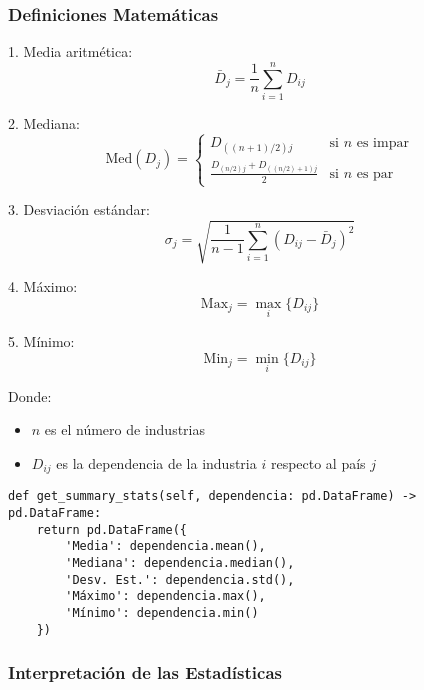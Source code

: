 \documentclass[11pt,a4paper]{article}
\begin{document}
\subsubsection{Definiciones Matemáticas}

1. Media aritmética:
\begin{equation}
\bar{D}_j = \frac{1}{n} \sum_{i=1}^n D_{ij}
\end{equation}

2. Mediana:
\begin{equation}
\text{Med}(D_j) = \begin{cases}
D_{((n+1)/2)j} & \text{si } n \text{ es impar} \\
\frac{D_{(n/2)j} + D_{((n/2)+1)j}}{2} & \text{si } n \text{ es par}
\end{cases}
\end{equation}

3. Desviación estándar:
\begin{equation}
\sigma_j = \sqrt{\frac{1}{n-1} \sum_{i=1}^n (D_{ij} - \bar{D}_j)^2}
\end{equation}

4. Máximo:
\begin{equation}
\text{Max}_j = \max_{i} \{D_{ij}\}
\end{equation}

5. Mínimo:
\begin{equation}
\text{Min}_j = \min_{i} \{D_{ij}\}
\end{equation}

Donde:
\begin{itemize}
    \item $n$ es el número de industrias
    \item $D_{ij}$ es la dependencia de la industria $i$ respecto al país $j$
\end{itemize}

\begin{tcolorbox}[colback=codebackground,title=Implementación del Método]
\begin{lstlisting}
def get_summary_stats(self, dependencia: pd.DataFrame) -> pd.DataFrame:
    return pd.DataFrame({
        'Media': dependencia.mean(),
        'Mediana': dependencia.median(),
        'Desv. Est.': dependencia.std(),
        'Máximo': dependencia.max(),
        'Mínimo': dependencia.min()
    })
\end{lstlisting}
\end{tcolorbox}

\subsubsection{Interpretación de las Estadísticas}
\end{document}
